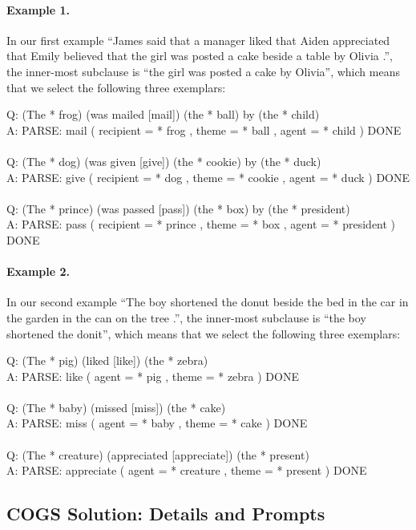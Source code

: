 \documentclass{article} \usepackage{iclr2022_conference,times}
\newcommand{\prompt}[1]{{\footnotesize \textsf{#1}}}
\begin{document}
\paragraph{Example 1.}
In our first example ``James said that a manager liked that Aiden appreciated that Emily believed that the girl was posted a cake beside a table by Olivia .'', the inner-most subclause is ``the girl was posted a cake by Olivia'', which means that we select the following three exemplars:

\prompt{Q: (The * frog) (was mailed [mail]) (the * ball) by (the * child) \\
A: PARSE: mail ( recipient = * frog , theme = * ball , agent = * child ) DONE \\
\\
Q: (The * dog) (was given [give]) (the * cookie) by (the * duck) \\
A: PARSE: give ( recipient = * dog , theme = * cookie , agent = * duck ) DONE \\
\\
Q: (The * prince) (was passed [pass]) (the * box) by (the * president) \\
A: PARSE: pass ( recipient = * prince , theme = * box , agent = * president ) DONE
}

\paragraph{Example 2.}
In our second example ``The boy shortened the donut beside the bed in the car in the garden in the can on the tree .'', the inner-most subclause is ``the boy shortened the donit'', which means that we select the following three exemplars:

\prompt{Q: (The * pig) (liked [like]) (the * zebra) \\
A: PARSE: like ( agent = * pig , theme = * zebra ) DONE \\
\\
Q: (The * baby) (missed [miss]) (the * cake) \\
A: PARSE: miss ( agent = * baby , theme = * cake ) DONE \\
\\
Q: (The * creature) (appreciated [appreciate]) (the * present) \\
A: PARSE: appreciate ( agent = * creature , theme = * present ) DONE \\
}


\subsection{COGS Solution: Details and Prompts}
\label{app:cogs_solution}
\end{document}
